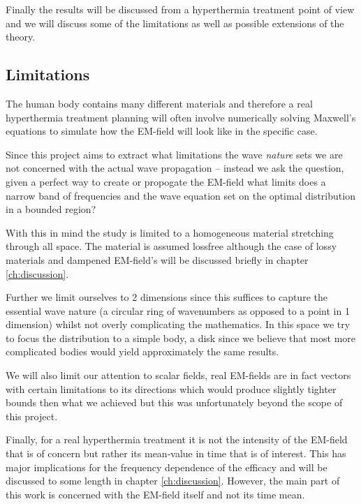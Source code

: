 \documentclass[11pt,a4paper, 
swedish,english %
]{article}
\begin{document}
Finally the results will be discussed from a hyperthermia treatment point of view and we will discuss some of the limitations as well as possible extensions of the theory.


\subsection{Limitations}
The human body contains many different materials and therefore a real hyperthermia treatment planning will often involve numerically solving Maxwell's equations to simulate how the EM-field will look like in the specific case.

Since this project aims to extract what limitations the wave \emph{nature} sets we are not concerned with the actual wave propagation -- instead we ask the question, given a perfect way to create or propogate the EM-field what limits does a narrow band of frequencies and the wave equation set on the optimal distribution in a bounded region?

With this in mind the study is limited to a homogeneous material stretching through all space. The material is assumed lossfree although the case of lossy materials and dampened EM-field's will be discussed briefly in chapter \ref{ch:discussion}.

Further we limit ourselves to 2 dimensions since this suffices to capture the essential wave nature (a circular ring of wavenumbers as opposed to a point in 1 dimension) whilst not overly complicating the mathematics. 
In this space we try to focus the distribution to a simple body, a disk since we believe that most more complicated bodies would yield approximately the same results.

We will also limit our attention to scalar fields, real EM-fields are in fact vectors with certain limitations to its directions which would produce slightly tighter bounds then what we achieved but this was unfortunately beyond the scope of this project.

Finally, for a real hyperthermia treatment it is not the intensity of the EM-field that is of concern but rather its mean-value in time that is of interest. This has major implications for the frequency dependence of the efficacy and will be discussed to some length in chapter \ref{ch:discussion}. However, the main part of this work is concerned with the EM-field itself and not its time mean.
\end{document}
